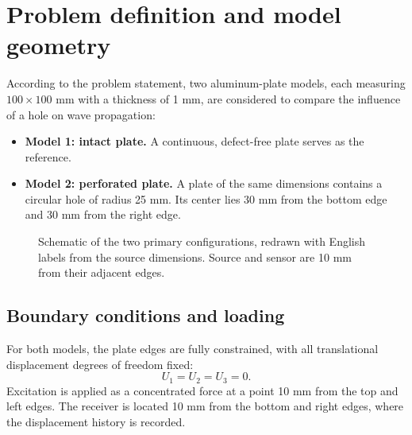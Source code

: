 \documentclass[11pt,a4paper]{article}
\begin{document}
\section{Problem definition and model geometry}
According to the problem statement, two aluminum-plate models, each measuring $100\times100$ mm with a thickness of 1 mm, are considered to compare the influence of a hole on wave propagation:
\begin{itemize}
\item \textbf{Model 1: intact plate.} A continuous, defect-free plate serves as the reference.
\item \textbf{Model 2: perforated plate.} A plate of the same dimensions contains a circular hole of radius 25 mm. Its center lies 30 mm from the bottom edge and 30 mm from the right edge.
\end{itemize}
\begin{figure}[H]\centering
{}
\caption{Schematic of the two primary configurations, redrawn with English labels from the source dimensions. Source and sensor are 10 mm from their adjacent edges.}\label{fig:1}\end{figure}

\subsection{Boundary conditions and loading}
For both models, the plate edges are fully constrained, with all translational displacement degrees of freedom fixed:
\begin{equation}U_1=U_2=U_3=0.\end{equation}
Excitation is applied as a concentrated force at a point 10 mm from the top and left edges. The receiver is located 10 mm from the bottom and right edges, where the displacement history is recorded.
\end{document}
